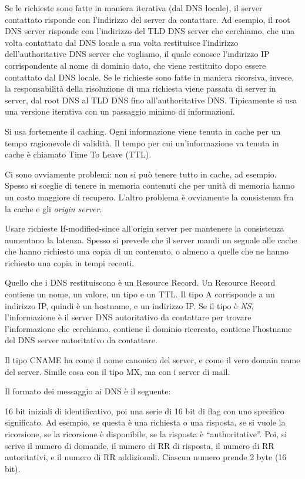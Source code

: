 Se le richieste sono fatte in maniera iterativa (dal DNS locale), il server contattato risponde con l'indirizzo del server da contattare. Ad esempio, il root DNS server risponde con l'indirizzo del TLD DNS server che cerchiamo, che una volta contattato dal DNS locale a sua volta restituisce l'indirizzo dell'authoritative DNS server che vogliamo, il quale conosce l'indirizzo IP corrispondente al nome di dominio dato, che viene restituito dopo essere contattato dal DNS locale. Se le richieste sono fatte in maniera ricorsiva, invece, la responsabilit\`a della risoluzione di una richiesta viene passata di server in server, dal root DNS al TLD DNS fino all'authoritative DNS. Tipicamente si usa una versione iterativa con un passaggio minimo di informazioni.

Si usa fortemente il caching. Ogni informazione viene tenuta in cache per un tempo ragionevole di validit\`a. Il tempo per cui un'informazione va tenuta in cache \`e chiamato Time To Leave (TTL). 

Ci sono ovviamente problemi: non si pu\`o tenere tutto in cache, ad esempio. Spesso si sceglie di tenere in memoria contenuti che per unit\`a di memoria hanno un costo maggiore di recupero. L'altro problema \`e ovviamente la consistenza fra la cache e gli \emph{origin server}.

Usare richieste If-modified-since all'origin server per mantenere la consistenza aumentano la latenza. Spesso si prevede che il server mandi un segnale alle cache che hanno richiesto una copia di un contenuto, o almeno a quelle che ne hanno richiesto una copia in tempi recenti.

Quello che i DNS restituiscono \`e un Resource Record. Un Resource Record contiene un nome, un valore, un tipo e un TTL. Il tipo A corrisponde a un indirizzo IP, quindi  \`e un hostname, e  un indirizzo IP. Se il tipo \`e \emph{NS}, l'informazione \`e il server DNS autoritativo da contattare per trovare l'informazione che cerchiamo.  contiene il dominio ricercato,  contiene l'hostname del DNS server autoritativo da contattare.

Il tipo CNAME ha come  il nome canonico del server, e come  il vero domain name del server. Simile cosa con il tipo MX, ma con i server di mail.

Il formato dei messaggio ai DNS \`e il seguente:

16 bit iniziali di identificativo, poi una serie di 16 bit di flag con uno specifico significato. Ad esempio, se questa \`e una richiesta o una risposta, se si vuole la ricorsione, se la ricorsione \`e disponibile, se la risposta \`e ``authoritative''. Poi, si scrive il numero di domande, il numero di RR di risposta, il numero di RR autoritativi, e il numero di RR addizionali. Ciascun numero prende 2 byte (16 bit).

